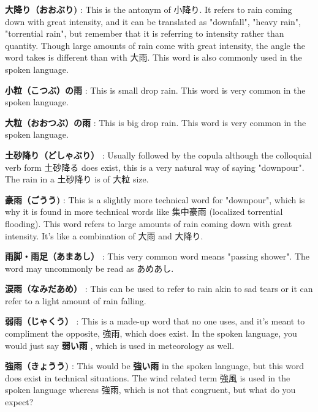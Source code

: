 \par{\textbf{大降り（おおぶり) }: This is the antonym of 小降り. It refers to rain coming down with great intensity, and it can be translated as "downfall", "heavy rain", "torrential rain", but remember that it is referring to intensity rather than quantity. Though large amounts of rain come with great intensity, the angle the word takes is different than with 大雨. This word is also commonly used in the spoken language. }

\par{\textbf{小粒（こつぶ）の雨 }: This is small drop rain. This word is very common in the spoken language. }

\par{\textbf{大粒（おおつぶ）の雨 }: This is big drop rain. This word is very common in the spoken language. }

\par{\textbf{土砂降り（どしゃぶり） }: Usually followed by the copula although the colloquial verb form 土砂降る does exist, this is a very natural way of saying "downpour". The rain in a 土砂降り is of 大粒 size. }

\par{\textbf{豪雨（ごうう) }: This is a slightly more technical word for "downpour", which is why it is found in more technical words like 集中豪雨 (localized torrential flooding). This word refers to large amounts of rain coming down with great intensity. It's like a combination of 大雨 and 大降り. }

\par{\textbf{雨脚・雨足（あまあし） }: This very common word means "passing shower". The word may uncommonly be read as あめあし. }

\par{\textbf{涙雨（なみだあめ） }: This can be used to refer to rain akin to sad tears or it can refer to a light amount of rain falling. }

\par{\textbf{弱雨（じゃくう） }: This is a made-up word that no one uses, and it's meant to compliment the opposite, 強雨, which does exist. In the spoken language, you would just say \textbf{弱い雨 }, which is used in meteorology as well. }

\par{\textbf{強雨（きょうう) }: This would be \textbf{強い雨 }in the spoken language, but this word does exist in technical situations. The wind related term 強風 is used in the spoken language whereas 強雨, which is not that congruent, but what do you expect? }

